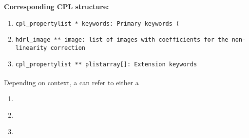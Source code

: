\begin{datastructdef}
\textbf{Corresponding \ac{CPL} structure:}
\begin{enumerate}
    \item \texttt{cpl\_propertylist * keywords: Primary keywords (\hyperref[fits:pro.catg]{}}
    \item \texttt{hdrl\_image ** image: list of images with coefficients for the non-linearity correction}
    \item \texttt{cpl\_propertylist ** plistarray[]: Extension keywords}
\end{enumerate}
\end{datastructdef}

\paragraph{\hyperref[dataitem:master_dark_det]{}}\label{dataitem:master_dark_det}
\label{dataitem:masterdark}
Depending on context, a \hyperref[dataitem:master_dark_det]{} can refer to either a
\begin{enumerate}
\item \hyperref[dataitem:master_dark_geo]{}
\item \hyperref[dataitem:master_dark_2rg]{}
\item \hyperref[dataitem:master_dark_ifu]{}
\end{enumerate}


